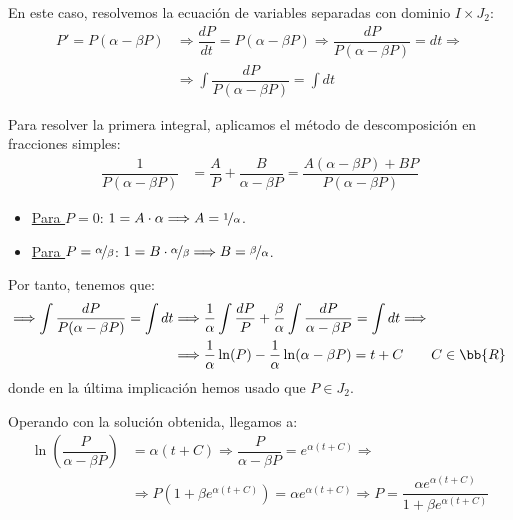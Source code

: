 \begin{ejercicio}
\begin{itemize}
        En este caso, resolvemos la ecuación de variables separadas con dominio $I\times J_2$:
        \begin{align*}
            P' = P(\alpha - \beta P) &\Longrightarrow \dfrac{dP}{dt} = P(\alpha - \beta P) \Longrightarrow \dfrac{dP}{P(\alpha - \beta P)} = dt \Longrightarrow \\ &\Longrightarrow \int \dfrac{dP}{P(\alpha - \beta P)} = \int dt
        \end{align*}

        Para resolver la primera integral, aplicamos el método de descomposición en fracciones simples:
        \begin{align*}
            \dfrac{1}{P(\alpha - \beta P)} &= \dfrac{A}{P} + \dfrac{B}{\alpha - \beta P} = \dfrac{A(\alpha - \beta P) + BP}{P(\alpha - \beta P)}
        \end{align*}
        \begin{itemize}
            \item \ul{Para $P=0$}: $1=A \cdot \alpha \Longrightarrow A=\nicefrac{1}{\alpha}$.
            \item \ul{Para $P=\nicefrac{\alpha}{\beta}$}: $1=B \cdot \nicefrac{\alpha}{\beta} \Longrightarrow B=\nicefrac{\beta}{\alpha}$.
        \end{itemize}

        Por tanto, tenemos que:
        \begin{align*}
            \Longrightarrow \int \dfrac{dP}{P(\alpha - \beta P)} = \int dt
            &\Longrightarrow \frac{1}{\alpha}\int \dfrac{dP}{P} + \frac{\beta}{\alpha}\int \dfrac{dP}{\alpha - \beta P} = \int dt \Longrightarrow \\ &\Longrightarrow \dfrac{1}{\alpha}\ln(P) - \dfrac{1}{\alpha}\ln(\alpha - \beta P) = t + C \qquad C\in \bb{R}
        \end{align*}
        donde en la última implicación hemos usado que $P\in J_2$.

        Operando con la solución obtenida, llegamos a:
        \begin{align*}
            \ln\left(\dfrac{P}{\alpha - \beta P}\right) &= \alpha(t + C) \Longrightarrow \dfrac{P}{\alpha - \beta P} = e^{\alpha (t + C)}
            \Longrightarrow\\ &\Longrightarrow P(1+\beta e^{\alpha (t + C)}) = \alpha e^{\alpha (t + C)} \Longrightarrow P = \dfrac{\alpha e^{\alpha (t + C)}}{1+\beta e^{\alpha (t + C)}}
        \end{align*}


\end{itemize}
\end{ejercicio}
